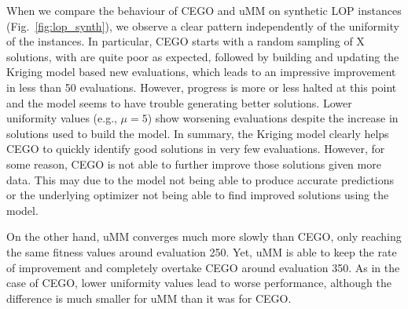 \documentclass[runningheads]{llncs}
\begin{document}
When we compare the behaviour of CEGO and uMM on synthetic LOP instances
(Fig.~\ref{fig:lop_synth}), we observe a clear pattern independently of the
uniformity of the instances. In particular, CEGO starts with a random sampling
of X solutions, with are quite poor as expected, followed by building and
updating the Kriging model based new evaluations, which leads to an impressive
improvement in less than 50 evaluations. However, progress is more or less
halted at this point and the model seems to have trouble generating better
solutions. Lower uniformity values (e.g., $\mu=5$) show worsening evaluations
despite the increase in solutions used to build the model. In summary, the
Kriging model clearly helps CEGO to quickly identify good solutions in very few
evaluations. However, for some reason, CEGO is not able to further improve
those solutions given more data. This may due to the model not being able to
produce accurate predictions or the underlying optimizer not being able to find
improved solutions using the model.


On the other hand, uMM converges much more slowly than CEGO, only reaching the
same fitness values around evaluation 250. Yet, uMM is able to keep the rate of
improvement and completely overtake CEGO around evaluation 350. As in the case
of CEGO, lower uniformity values lead to worse performance, although the
difference is much smaller for uMM than it was for CEGO.


\newcommand{\supplement}{\citep{Supplementary}}
\end{document}
